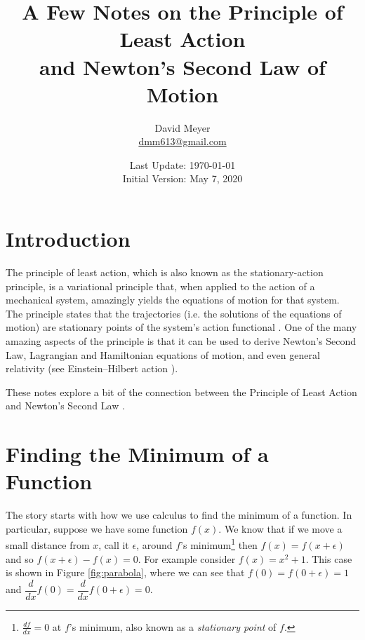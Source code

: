 \documentclass{article}
\title{A Few Notes on the Principle of Least Action \\ and Newton's Second Law of Motion}
\author{David Meyer \\ \href{mailto:dmm613@gmail.com}
                            {dmm613@gmail.com}}
\date{Last Update: \today \\
	 {\vspace{1.00mm} \small Initial Version: May 7, 2020}}
\theoremstyle{definition}
\begin{document}
\maketitle

%
\section{Introduction}
The principle of least action, which is also known as the
stationary-action principle, is a variational principle that,
when applied to the action of a mechanical system, amazingly
yields the equations of motion for that system. The principle
states that the trajectories (i.e. the solutions of the equations
of motion) are stationary points of the system's action
functional  \cite{malham2016}. One of the many amazing aspects of
the principle is that it can be used to derive Newton's Second
Law, Lagrangian and Hamiltonian equations of motion, and even
general relativity (see Einstein–Hilbert action
\cite{wiki:einstein_hilbert_action}).  

\bigskip
\noindent
These notes explore a bit of the connection between the Principle
of Least Action \cite{wiki:stationary_action_principle} and
Newton's Second Law \cite{wiki:newtons_laws}. 

\section{Finding the Minimum of a Function}
\label{sec:minimum}
{ 
The story starts with how we use calculus to find the minimum of
a function. In particular, suppose we have some function
$f(x)$. We know that  if we move a small distance from $x$, call
it $\epsilon$, around $f$'s minimum\footnote{$\frac{df}{dx}= 0$
at $f$'s minimum, also known as a  \emph{stationary point} of
$f$.} then $f(x) = f(x + \epsilon)$ and so $f(x + \epsilon) -
f(x) = 0$. For example consider $f(x) = x^2 +1$. This case  is
shown in Figure \ref{fig:parabola}, where we can see that $f(0) =
f(0+\epsilon) = 1$ and $ \dfrac{d}{dx} f(0)  = \dfrac{d}{dx} f(0
+ \epsilon) = 0$. \par} 
\end{document}
